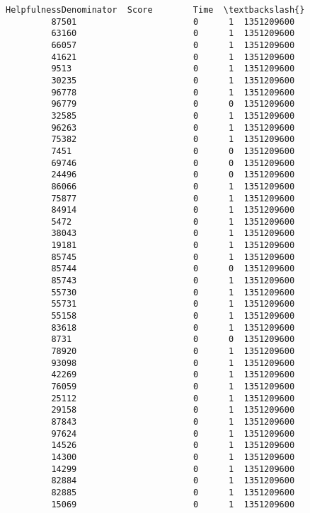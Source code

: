 \documentclass[11pt]{article}
\begin{document}
\begin{Verbatim}[commandchars=\\\{\}]
                HelpfulnessDenominator  Score        Time  \textbackslash{}
         87501                       0      1  1351209600   
         63160                       0      1  1351209600   
         66057                       0      1  1351209600   
         41621                       0      1  1351209600   
         9513                        0      1  1351209600   
         30235                       0      1  1351209600   
         96778                       0      1  1351209600   
         96779                       0      0  1351209600   
         32585                       0      1  1351209600   
         96263                       0      1  1351209600   
         75382                       0      1  1351209600   
         7451                        0      0  1351209600   
         69746                       0      0  1351209600   
         24496                       0      0  1351209600   
         86066                       0      1  1351209600   
         75877                       0      1  1351209600   
         84914                       0      1  1351209600   
         5472                        0      1  1351209600   
         38043                       0      1  1351209600   
         19181                       0      1  1351209600   
         85745                       0      1  1351209600   
         85744                       0      0  1351209600   
         85743                       0      1  1351209600   
         55730                       0      1  1351209600   
         55731                       0      1  1351209600   
         55158                       0      1  1351209600   
         83618                       0      1  1351209600   
         8731                        0      0  1351209600   
         78920                       0      1  1351209600   
         93098                       0      1  1351209600   
         42269                       0      1  1351209600   
         76059                       0      1  1351209600   
         25112                       0      1  1351209600   
         29158                       0      1  1351209600   
         87843                       0      1  1351209600   
         97624                       0      1  1351209600   
         14526                       0      1  1351209600   
         14300                       0      1  1351209600   
         14299                       0      1  1351209600   
         82884                       0      1  1351209600   
         82885                       0      1  1351209600   
         15069                       0      1  1351209600   

\end{Verbatim}
\end{document}
